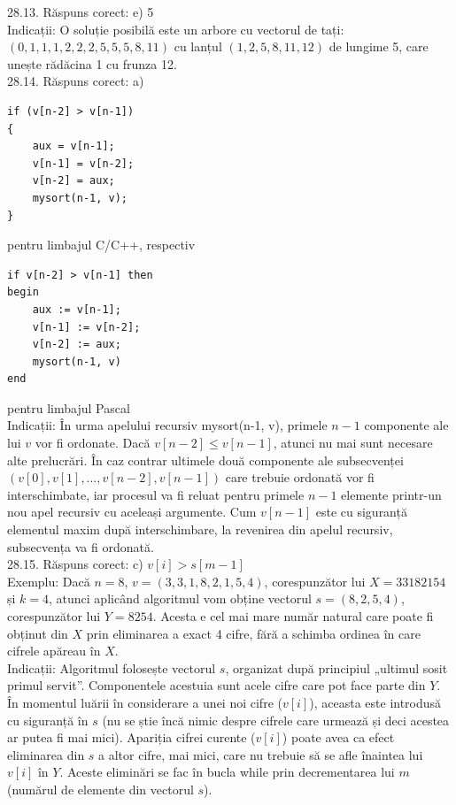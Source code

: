 28.13. Răspuns corect: e) 5\\
Indicații: O soluție posibilă este un arbore cu vectorul de tați:\\ $(0,1,1,1,2,2,2,5,5,5,8,11)$ cu lanțul $(1,2,5,8,11,12)$ de lungime 5, care unește rădăcina 1 cu frunza 12.\\

28.14. Răspuns corect: a)\\
\begin{verbatim}
if (v[n-2] > v[n-1])
{
    aux = v[n-1];
    v[n-1] = v[n-2];
    v[n-2] = aux;
    mysort(n-1, v);
}
\end{verbatim} pentru limbajul C/C++, respectiv\\
\begin{verbatim}
if v[n-2] > v[n-1] then
begin
    aux := v[n-1];
    v[n-1] := v[n-2];
    v[n-2] := aux;
    mysort(n-1, v)
end
\end{verbatim} pentru limbajul Pascal\\
Indicații: În urma apelului recursiv mysort(n-1, v), primele $n-1$ componente ale lui $v$ vor fi ordonate. Dacă $v[n-2] \leq v[n-1]$, atunci nu mai sunt necesare alte prelucrări. În caz contrar ultimele două componente ale subsecvenței $(v[0], v[1], \ldots, v[n-2], v[n-1])$ care trebuie ordonată vor fi interschimbate, iar procesul va fi reluat pentru primele $n-1$ elemente printr-un nou apel recursiv cu aceleași argumente. Cum $v[n-1]$ este cu siguranță elementul maxim după interschimbare, la revenirea din apelul recursiv, subsecvența va fi ordonată.\\

28.15. Răspuns corect: c) $v[i]>s[m-1]$\\
Exemplu: Dacă $n=8$, $v=(3,3,1,8,2,1,5,4)$, corespunzător lui $X=33182154$ și $k=4$, atunci aplicând algoritmul vom obține vectorul $s=(8,2,5,4)$, corespunzător lui $Y=8254$. Acesta e cel mai mare număr natural care poate fi obținut din $X$ prin eliminarea a exact 4 cifre, fără a schimba ordinea în care cifrele apăreau în $X$.\\ Indicații: Algoritmul folosește vectorul $s$, organizat după principiul „ultimul sosit primul servit”. Componentele acestuia sunt acele cifre care pot face parte din $Y$. În momentul luării în considerare a unei noi cifre ($v[i]$), aceasta este introdusă cu siguranță în $s$ (nu se știe încă nimic despre cifrele care urmează și deci acestea ar putea fi mai mici). Apariția cifrei curente ($v[i]$) poate avea ca efect eliminarea din $s$ a altor cifre, mai mici, care nu trebuie să se afle înaintea lui $v[i]$ în $Y$. Aceste eliminări se fac în bucla while prin decrementarea lui $m$ (numărul de elemente din vectorul $s$).\\

